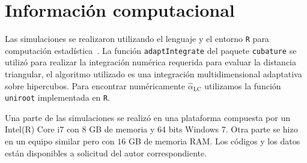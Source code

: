 \chapter{Información computacional}


Las simulaciones se realizaron utilizando el lenguaje y el entorno \texttt R para computación estadística~\cite{RLanguage}.
La función \texttt{adaptIntegrate} del paquete \texttt{cubature} se utilizó para realizar la integración numérica requerida para evaluar la distancia triangular, el algoritmo utilizado es una integración multidimensional adaptativa sobre hipercubos. Para encontrar numéricamente $\widehat\alpha_{\text{LC}}$ utilizamos la función \texttt{uniroot} implementada en \texttt R.

Una parte de las simulaciones se realizó en una plataforma compuesta por un Intel(R) Core i7 con $8$ GB de memoria y $64$ bits  Windows  7. Otra parte se hizo en un equipo similar pero con $16$ GB de memoria RAM.
Los códigos y los datos están disponibles a solicitud del autor correspondiente.